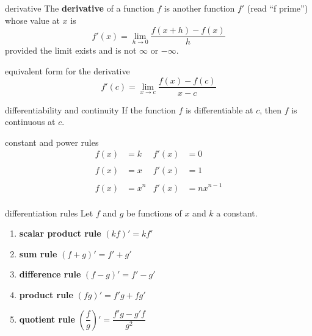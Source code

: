 \documentclass[avery5371,grid]{flashcards}
\begin{document}
\begin{flashcard}[Definition]{derivative}
The \textbf{derivative} of a function $f$ is another function
$f'$ (read ``f prime'') whose value at $x$ is
\begin{equation*}
f'(x) = \lim_{h \rightarrow 0} \dfrac{f(x+h) - f(x)}{h}
\end{equation*}
provided the limit exists and is not $\infty$ or $-\infty$.
\end{flashcard}

\begin{flashcard}[Definition]{equivalent form for the derivative}
\begin{equation*}
f'(c) = \lim_{x \rightarrow c} \dfrac{f(x) - f(c)}{x - c}
\end{equation*}
\end{flashcard}

\begin{flashcard}[Theorem]{differentiability and continuity}
If the function $f$ is differentiable at $c$, then $f$ is continuous at $c$.
\end{flashcard}

\begin{flashcard}[Theorem]{constant and power rules}
\begin{align*}
f(x) &= k & f'(x) &=0 \\
\\
f(x) &= x & f'(x) &=1 \\
\\
f(x) &= x^{n} & f'(x) &=nx^{n-1} \\
\end{align*}
\end{flashcard}

\begin{flashcard}[Theorem]{differentiation rules}
Let $f$ and $g$ be functions of $x$ and $k$ a constant.
\begin{enumerate}
\item \textbf{scalar product rule} $(kf)' = kf'$
\item \textbf{sum rule} $(f+g)' = f' + g'$
\item \textbf{difference rule} $(f-g)' = f' - g'$
\item \textbf{product rule} $(fg)' = f'g + fg'$
\item \textbf{quotient rule} $\left( \dfrac{f}{g} \right)' = \dfrac{f'g - g'f}{g^2}$
\end{enumerate}
\end{flashcard}
\end{document}
